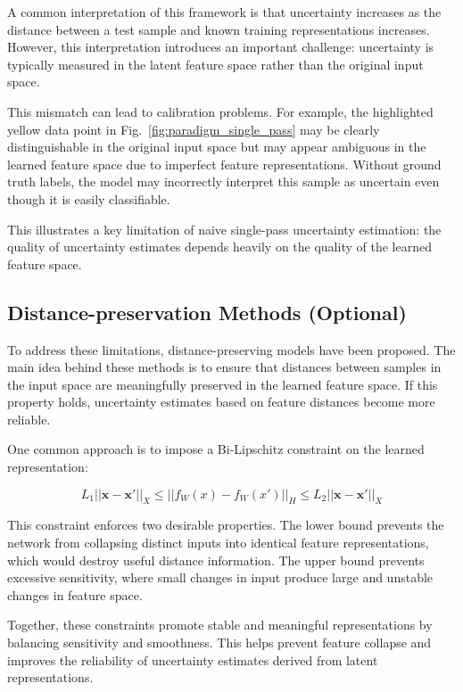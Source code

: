 \documentclass{article}
\begin{document}
A common interpretation of this framework is that uncertainty increases as the distance between a test sample and known training representations increases. However, this interpretation introduces an important challenge: uncertainty is typically measured in the latent feature space rather than the original input space.

This mismatch can lead to calibration problems. For example, the highlighted yellow data point in Fig.~\ref{fig:paradigm_single_pass} may be clearly distinguishable in the original input space but may appear ambiguous in the learned feature space due to imperfect feature representations. Without ground truth labels, the model may incorrectly interpret this sample as uncertain even though it is easily classifiable.

This illustrates a key limitation of naive single-pass uncertainty estimation: the quality of uncertainty estimates depends heavily on the quality of the learned feature space.

\subsection{Distance-preservation Methods (Optional)}

To address these limitations, distance-preserving models have been proposed. The main idea behind these methods is to ensure that distances between samples in the input space are meaningfully preserved in the learned feature space. If this property holds, uncertainty estimates based on feature distances become more reliable.

One common approach is to impose a Bi-Lipschitz constraint on the learned representation:

\[
L_1||\boldsymbol{x} - \boldsymbol{x'}||_X 
\leq 
||f_W(x) - f_W(x')||_H 
\leq 
L_2 ||\boldsymbol{x} - \boldsymbol{x'}||_X
\]

This constraint enforces two desirable properties. The lower bound prevents the network from collapsing distinct inputs into identical feature representations, which would destroy useful distance information. The upper bound prevents excessive sensitivity, where small changes in input produce large and unstable changes in feature space.

Together, these constraints promote stable and meaningful representations by balancing sensitivity and smoothness. This helps prevent feature collapse and improves the reliability of uncertainty estimates derived from latent representations.
\end{document}
